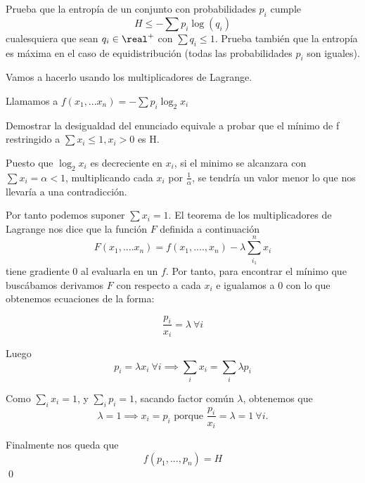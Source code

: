\begin{problem}[3]
	Prueba que la entropía de un conjunto con probabilidades $p_i$ cumple
	\[H \leq -\sum p_i \log(q_i)\]
	cualesquiera que sean $q_i\in \real^+$ con $\sum q_i \leq 1$. Prueba también que la entropía es máxima en el caso de equidistribución (todas las probabilidades $p_i$ son iguales).
	\solution

	Vamos a hacerlo usando los multiplicadores de Lagrange.

	Llamamos a $f(x_1, ... x_n) = - \sum p_i \log_2 x_i$

	Demostrar la desigualdad del enunciado equivale a probar que el mínimo de f restringido a $\sum x_i \leq 1, x_i > 0$ es H.

	Puesto que $\log_2 x_i$ es decreciente en $x_i$, si el minimo se alcanzara con $\sum x_i = \alpha < 1$, multiplicando cada $x_i$ por $\frac{1}{\alpha}$, se tendría un valor menor lo que nos llevaría a una contradicción.

	Por tanto podemos suponer $\sum x_i = 1$. El teorema de los multiplicadores de Lagrange nos dice que la función $F$ definida a continuación
	$$F(x_1, .... x_n) = f(x_1, ...., x_n) - \lambda \sum_{i_1}^{n} x_i$$
	tiene gradiente 0 al evaluarla en un $f$. Por tanto, para encontrar el mínimo que buscábamos derivamos $F$ con respecto a cada $x_i$ e igualamos a 0 con lo que obtenemos ecuaciones de la forma:

	\[\frac{p_i}{x_i}=λ \ \forall i\]

Luego
\[p_i = \lambda x_i \ \forall i \implies \sum_{i} x_i = \sum_{i} \lambda p_i \]

Como $\sum\limits_{i} x_i = 1$, y $\sum\limits_{i} p_i = 1$, sacando factor común $\lambda$, obtenemos que
\[ \lambda = 1 \implies x_i = p_i \text{ porque }\frac{p_i}{x_i} = \lambda = 1 \ \forall i. \]

	Finalmente nos queda que
	$$f(p_1, ...,p_n) = H$$ \qed
\end{problem}

